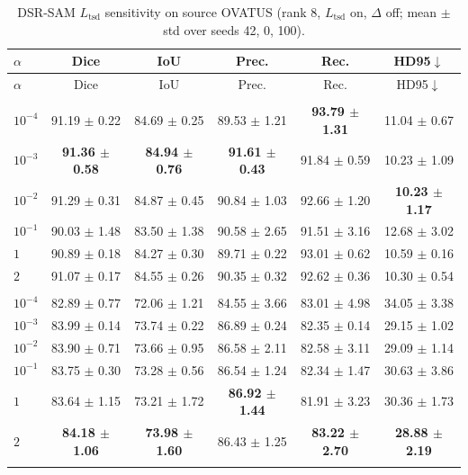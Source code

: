 \documentclass[10pt]{article}
\begin{document}
{\small
\begin{longtable}{lccccc}
\caption{DSR-SAM $L_{\mathrm{tsd}}$ sensitivity on source OVATUS (rank 8, $L_{\mathrm{tsd}}$ on, $\Delta$ off; mean $\pm$ std over seeds 42, 0, 100).}
\label{tab:ltsd_alpha_ovatus}\\
\toprule
$\alpha$ & Dice & IoU & Prec. & Rec. & HD95$\downarrow$ \\
\midrule
\endfirsthead
\toprule
$\alpha$ & Dice & IoU & Prec. & Rec. & HD95$\downarrow$ \\
\midrule
\endhead
\endfoot
\bottomrule
\endlastfoot
\multicolumn{6}{l}{\textit{Target: OTU}} \\
\midrule
$10^{-4}$ & 91.19 $\pm$ 0.22 & 84.69 $\pm$ 0.25 & 89.53 $\pm$ 1.21 & \textbf{93.79 $\pm$ 1.31} & 11.04 $\pm$ 0.67 \\
$10^{-3}$ & \textbf{91.36 $\pm$ 0.58} & \textbf{84.94 $\pm$ 0.76} & \textbf{91.61 $\pm$ 0.43} & 91.84 $\pm$ 0.59 & 10.23 $\pm$ 1.09 \\
$10^{-2}$ & 91.29 $\pm$ 0.31 & 84.87 $\pm$ 0.45 & 90.84 $\pm$ 1.03 & 92.66 $\pm$ 1.20 & \textbf{10.23 $\pm$ 1.17} \\
$10^{-1}$ & 90.03 $\pm$ 1.48 & 83.50 $\pm$ 1.38 & 90.58 $\pm$ 2.65 & 91.51 $\pm$ 3.16 & 12.68 $\pm$ 3.02 \\
$1$ & 90.89 $\pm$ 0.18 & 84.27 $\pm$ 0.30 & 89.71 $\pm$ 0.22 & 93.01 $\pm$ 0.62 & 10.59 $\pm$ 0.16 \\
$2$ & 91.07 $\pm$ 0.17 & 84.55 $\pm$ 0.26 & 90.35 $\pm$ 0.32 & 92.62 $\pm$ 0.36 & 10.30 $\pm$ 0.54 \\
\addlinespace[4pt]
\multicolumn{6}{l}{\textit{Target: USOVA}} \\
\midrule
$10^{-4}$ & 82.89 $\pm$ 0.77 & 72.06 $\pm$ 1.21 & 84.55 $\pm$ 3.66 & 83.01 $\pm$ 4.98 & 34.05 $\pm$ 3.38 \\
$10^{-3}$ & 83.99 $\pm$ 0.14 & 73.74 $\pm$ 0.22 & 86.89 $\pm$ 0.24 & 82.35 $\pm$ 0.14 & 29.15 $\pm$ 1.02 \\
$10^{-2}$ & 83.90 $\pm$ 0.71 & 73.66 $\pm$ 0.95 & 86.58 $\pm$ 2.11 & 82.58 $\pm$ 3.11 & 29.09 $\pm$ 1.14 \\
$10^{-1}$ & 83.75 $\pm$ 0.30 & 73.28 $\pm$ 0.56 & 86.54 $\pm$ 1.24 & 82.34 $\pm$ 1.47 & 30.63 $\pm$ 3.86 \\
$1$ & 83.64 $\pm$ 1.15 & 73.21 $\pm$ 1.72 & \textbf{86.92 $\pm$ 1.44} & 81.91 $\pm$ 3.23 & 30.36 $\pm$ 1.73 \\
$2$ & \textbf{84.18 $\pm$ 1.06} & \textbf{73.98 $\pm$ 1.60} & 86.43 $\pm$ 1.25 & \textbf{83.22 $\pm$ 2.70} & \textbf{28.88 $\pm$ 2.19} \\
\addlinespace[4pt]
\end{longtable}
}
\end{document}

